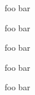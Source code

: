 \documentclass{beamer}
\begin{document}
\begin{frame}{foo}
bar
\end{frame}

\begin{frame}[notitle]{foo}
bar
\end{frame}

\begin{frame}{foo}
bar
\end{frame}

\begin{frame}[highlight]{foo}
bar
\end{frame}

\begin{frame}{foo}
bar
\end{frame}
\end{document}
